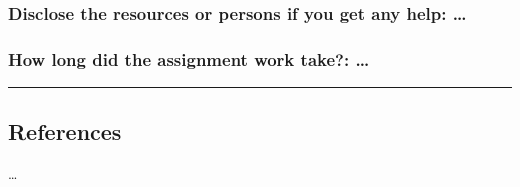 \documentclass[
]{article}
\begin{document}
\hypertarget{disclose-the-resources-or-persons-if-you-get-any-help}{%
\subsubsection{Disclose the resources or persons if you get any help:
\ldots{}}\label{disclose-the-resources-or-persons-if-you-get-any-help}}

\hypertarget{how-long-did-the-assignment-work-take}{%
\subsubsection{How long did the assignment work take?:
\ldots{}}\label{how-long-did-the-assignment-work-take}}

\begin{center}\rule{0.5\linewidth}{0.5pt}\end{center}

\hypertarget{references}{%
\subsection{References}\label{references}}

\ldots{}
\end{document}
